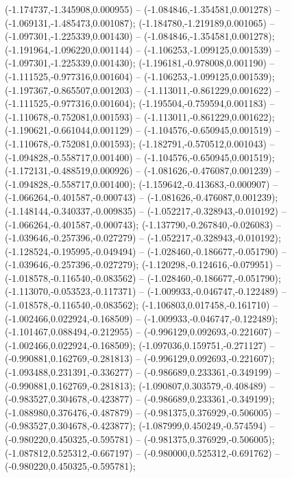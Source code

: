  (-1.174737,-1.345908,0.000955) -- (-1.084846,-1.354581,0.001278) -- (-1.069131,-1.485473,0.001087);
 (-1.184780,-1.219189,0.001065) -- (-1.097301,-1.225339,0.001430) -- (-1.084846,-1.354581,0.001278);
 (-1.191964,-1.096220,0.001144) -- (-1.106253,-1.099125,0.001539) -- (-1.097301,-1.225339,0.001430);
 (-1.196181,-0.978008,0.001190) -- (-1.111525,-0.977316,0.001604) -- (-1.106253,-1.099125,0.001539);
 (-1.197367,-0.865507,0.001203) -- (-1.113011,-0.861229,0.001622) -- (-1.111525,-0.977316,0.001604);
 (-1.195504,-0.759594,0.001183) -- (-1.110678,-0.752081,0.001593) -- (-1.113011,-0.861229,0.001622);
 (-1.190621,-0.661044,0.001129) -- (-1.104576,-0.650945,0.001519) -- (-1.110678,-0.752081,0.001593);
 (-1.182791,-0.570512,0.001043) -- (-1.094828,-0.558717,0.001400) -- (-1.104576,-0.650945,0.001519);
 (-1.172131,-0.488519,0.000926) -- (-1.081626,-0.476087,0.001239) -- (-1.094828,-0.558717,0.001400);
 (-1.159642,-0.413683,-0.000907) -- (-1.066264,-0.401587,-0.000743) -- (-1.081626,-0.476087,0.001239);
 (-1.148144,-0.340337,-0.009835) -- (-1.052217,-0.328943,-0.010192) -- (-1.066264,-0.401587,-0.000743);
 (-1.137790,-0.267840,-0.026083) -- (-1.039646,-0.257396,-0.027279) -- (-1.052217,-0.328943,-0.010192);
 (-1.128524,-0.195995,-0.049494) -- (-1.028460,-0.186677,-0.051790) -- (-1.039646,-0.257396,-0.027279);
 (-1.120298,-0.124616,-0.079951) -- (-1.018578,-0.116540,-0.083562) -- (-1.028460,-0.186677,-0.051790);
 (-1.113070,-0.053523,-0.117371) -- (-1.009933,-0.046747,-0.122489) -- (-1.018578,-0.116540,-0.083562);
 (-1.106803,0.017458,-0.161710) -- (-1.002466,0.022924,-0.168509) -- (-1.009933,-0.046747,-0.122489);
 (-1.101467,0.088494,-0.212955) -- (-0.996129,0.092693,-0.221607) -- (-1.002466,0.022924,-0.168509);
 (-1.097036,0.159751,-0.271127) -- (-0.990881,0.162769,-0.281813) -- (-0.996129,0.092693,-0.221607);
 (-1.093488,0.231391,-0.336277) -- (-0.986689,0.233361,-0.349199) -- (-0.990881,0.162769,-0.281813);
 (-1.090807,0.303579,-0.408489) -- (-0.983527,0.304678,-0.423877) -- (-0.986689,0.233361,-0.349199);
 (-1.088980,0.376476,-0.487879) -- (-0.981375,0.376929,-0.506005) -- (-0.983527,0.304678,-0.423877);
 (-1.087999,0.450249,-0.574594) -- (-0.980220,0.450325,-0.595781) -- (-0.981375,0.376929,-0.506005);
 (-1.087812,0.525312,-0.667197) -- (-0.980000,0.525312,-0.691762) -- (-0.980220,0.450325,-0.595781);
